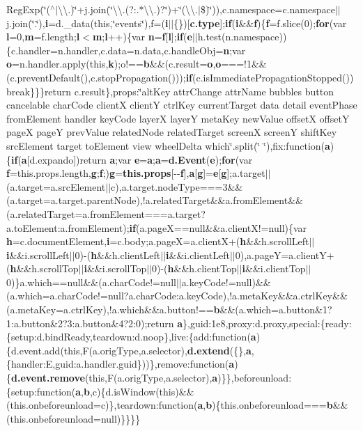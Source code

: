 \begin{DoxyCompactItemize}
Reg\-Exp(\char`\"{}($^\wedge$$|$\textbackslash{}\textbackslash{}.)\char`\"{}+j.\-join(\char`\"{}\textbackslash{}\textbackslash{}.(?\-:.$\ast$\textbackslash{}\textbackslash{}.)?\char`\"{})+\char`\"{}(\textbackslash{}\textbackslash{}.$|$\$)\char`\"{})),c.\-namespace=c.\-namespace$|$$|$j.\-join(\char`\"{}.\char`\"{}),{\bf i}=d.\-\_\-data(this,\char`\"{}events\char`\"{}),f=({\bf i}$|$$|$\{\})[{\bf c.\-type}];{\bf if}({\bf i}\&\&{\bf f})\{{\bf f}=f.\-slice(0);{\bf for}(var {\bf l}=0,{\bf m}=f.\-length;{\bf l}$<${\bf m};{\bf l}++)\{var {\bf n}={\bf f}[{\bf l}];{\bf if}({\bf e}$|$$|$h.\-test(n.\-namespace))\{c.\-handler=n.\-handler,c.\-data=n.\-data,c.\-handle\-Obj={\bf n};var {\bf o}=n.\-handler.\-apply(this,{\bf k});o!=={\bf b}\&\&(c.\-result={\bf o},{\bf o}===!1\&\&(c.\-prevent\-Default(),c.\-stop\-Propagation()));{\bf if}(c.\-is\-Immediate\-Propagation\-Stopped())break\}\}\}return c.\-result\},props\-:\char`\"{}alt\-Key attr\-Change attr\-Name bubbles button cancelable char\-Code client\-X client\-Y ctrl\-Key current\-Target data detail event\-Phase from\-Element handler key\-Code layer\-X layer\-Y meta\-Key new\-Value offset\-X offset\-Y page\-X page\-Y prev\-Value related\-Node related\-Target screen\-X screen\-Y shift\-Key src\-Element target to\-Element view wheel\-Delta which\char`\"{}.split(\char`\"{} \char`\"{}),fix\-:function({\bf a})\{{\bf if}({\bf a}[d.\-expando])return {\bf a};var {\bf e}={\bf a};{\bf a}={\bf d.\-Event}({\bf e});{\bf for}(var {\bf f}=this.\-props.\-length,{\bf g};{\bf f};){\bf g}={\bf this.\-props}[-\/-\/{\bf f}],{\bf a}[{\bf g}]={\bf e}[{\bf g}];a.\-target$|$$|$(a.\-target=a.\-src\-Element$|$$|$c),a.\-target.\-node\-Type===3\&\&(a.\-target=a.\-target.\-parent\-Node),!a.\-related\-Target\&\&a.\-from\-Element\&\&(a.\-related\-Target=a.\-from\-Element===a.\-target?a.\-to\-Element\-:a.\-from\-Element);{\bf if}(a.\-page\-X==null\&\&a.\-client\-X!=null)\{var {\bf h}=c.\-document\-Element,{\bf i}=c.\-body;a.\-page\-X=a.\-client\-X+({\bf h}\&\&h.\-scroll\-Left$|$$|${\bf i}\&\&i.\-scroll\-Left$|$$|$0)-\/({\bf h}\&\&h.\-client\-Left$|$$|${\bf i}\&\&i.\-client\-Left$|$$|$0),a.\-page\-Y=a.\-client\-Y+({\bf h}\&\&h.\-scroll\-Top$|$$|${\bf i}\&\&i.\-scroll\-Top$|$$|$0)-\/({\bf h}\&\&h.\-client\-Top$|$$|${\bf i}\&\&i.\-client\-Top$|$$|$0)\}a.\-which==null\&\&(a.\-char\-Code!=null$|$$|$a.\-key\-Code!=null)\&\&(a.\-which=a.\-char\-Code!=null?a.\-char\-Code\-:a.\-key\-Code),!a.\-meta\-Key\&\&a.\-ctrl\-Key\&\&(a.\-meta\-Key=a.\-ctrl\-Key),!a.\-which\&\&a.\-button!=={\bf b}\&\&(a.\-which=a.\-button\&1?1\-:a.\-button\&2?3\-:a.\-button\&4?2\-:0);return {\bf a}\},guid\-:1e8,proxy\-:d.\-proxy,special\-:\{ready\-:\{setup\-:d.\-bind\-Ready,teardown\-:d.\-noop\},live\-:\{add\-:function({\bf a})\{d.\-event.\-add(this,F(a.\-orig\-Type,a.\-selector),{\bf d.\-extend}(\{\},{\bf a},\{handler\-:\-E,guid\-:a.\-handler.\-guid\}))\},remove\-:function({\bf a})\{{\bf d.\-event.\-remove}(this,F(a.\-orig\-Type,a.\-selector),{\bf a})\}\},beforeunload\-:\{setup\-:function({\bf a},{\bf b},c)\{d.\-is\-Window(this)\&\&(this.\-onbeforeunload=c)\},teardown\-:function({\bf a},{\bf b})\{this.\-onbeforeunload==={\bf b}\&\&(this.\-onbeforeunload=null)\}\}\}\}
$$
\end{DoxyCompactItemize}
